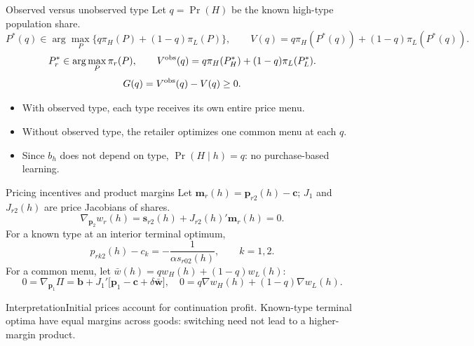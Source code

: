 \documentclass[aspectratio=169,11pt]{beamer}
\begin{document}
\begin{frame}[noframenumbering]{Observed versus unobserved type}
Let $q=\Pr(H)$ be the known high-type population share.
\[
P^*(q)\in\arg\max_P\{q\pi_H(P)+(1-q)\pi_L(P)\},
\qquad V(q)=q\pi_H(P^*(q))+(1-q)\pi_L(P^*(q)).
\]
\[
P_r^*\in\arg\max_P\pi_r(P),\qquad
V^{\rm obs}(q)=q\pi_H(P_H^*)+(1-q)\pi_L(P_L^*).
\]
\[
G(q)=V^{\rm obs}(q)-V(q)\geq0.
\]
\begin{itemize}
\item With observed type, each type receives its own entire price menu.
\item Without observed type, the retailer optimizes one common menu at each $q$.
\item Since $b_h$ does not depend on type, $\Pr(H\mid h)=q$: no purchase-based learning.
\end{itemize}
\par\hyperlink{pricing-setup}{}
\end{frame}

\begin{frame}[noframenumbering]{Pricing incentives and product margins}
\small
Let $\mathbf m_r(h)=\mathbf p_{r2}(h)-\mathbf c$; $J_1$ and $J_{r2}(h)$ are price Jacobians of shares.
\[
\nabla_{\mathbf p_2} w_r(h)=\mathbf s_{r2}(h)+J_{r2}(h)'\mathbf m_r(h)=0.
\]
For a known type at an interior terminal optimum,
\[
p_{rk2}(h)-c_k=-\frac{1}{\alpha s_{r02}(h)},\qquad k=1,2.
\]
For a common menu, let $\bar w(h)=q w_H(h)+(1-q)w_L(h)$:
\[
0=\nabla_{\mathbf p_1}\Pi
=\mathbf b+J_1'\bigl[\mathbf p_1-\mathbf c+\delta\bar{\mathbf w}\bigr],
\quad
0=q\nabla w_H(h)+(1-q)\nabla w_L(h).
\]
\begin{block}{Interpretation}Initial prices account for continuation profit. Known-type terminal optima have equal margins across goods: switching need not lead to a higher-margin product.\end{block}
\par\hyperlink{pricing-setup}{}
\end{frame}
\end{document}
